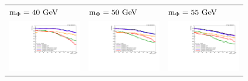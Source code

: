 \begin{figure}[htb!]
\begin{tabular}{>{\centering\arraybackslash}m{0.32\linewidth} >{\centering\arraybackslash}m{0.32\linewidth} >{\centering\arraybackslash}m{0.32\linewidth}}
		$\mphi=40\unit{GeV}$ & $\mphi=50\unit{GeV}$ & $\mphi=55\unit{GeV}$ \\
		\includegraphics[width=\linewidth]{figs/05_analysis/cutBasedID_effVsLxy_Z_m40_cats_2018.pdf} &
		\includegraphics[width=\linewidth]{figs/05_analysis/cutBasedID_effVsLxy_Z_m50_cats_2018.pdf} &
		\includegraphics[width=\linewidth]{figs/05_analysis/cutBasedID_effVsLxy_Z_m55_cats_2018.pdf} \\

\end{tabular}
\end{figure}
